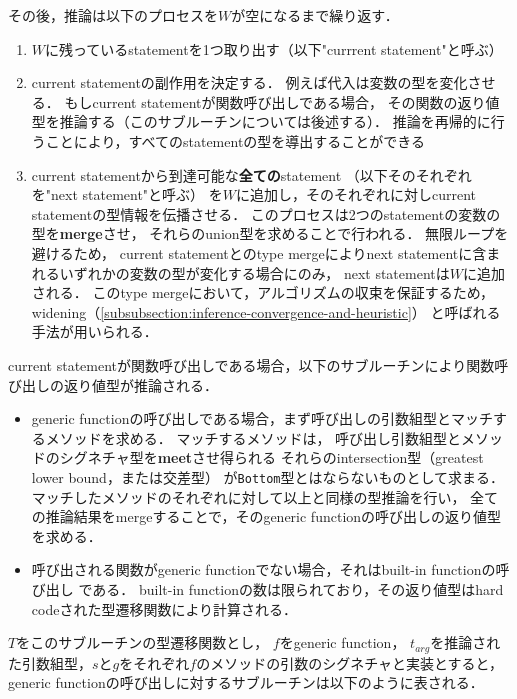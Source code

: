 その後，推論は以下のプロセスを\(W\)が空になるまで繰り返す．

\begin{enumerate}
  \item \(W\)に残っているstatementを1つ取り出す（以下"currrent statement"と呼ぶ）
  \item current statementの副作用を決定する．
        例えば代入は変数の型を変化させる．
        もしcurrent statementが関数呼び出しである場合，
        その関数の返り値型を推論する（このサブルーチンについては後述する）．
        推論を再帰的に行うことにより，すべてのstatementの型を導出することができる
  \item current statementから到達可能な\textbf{全ての}statement
        （以下そのそれぞれを"next statement"と呼ぶ）
        を\(W\)に追加し，そのそれぞれに対しcurrent statementの型情報を伝播させる．
        このプロセスは2つのstatementの変数の型を\textbf{merge}させ，
        それらのunion型を求めることで行われる．
        無限ループを避けるため，
        current statementとのtype mergeによりnext statementに含まれるいずれかの変数の型が変化する場合にのみ，
        next statementは\(W\)に追加される．
        このtype mergeにおいて，アルゴリズムの収束を保証するため，
        widening（\ref{subsubsection:inference-convergence-and-heuristic}）
        と呼ばれる手法が用いられる．
\end{enumerate}

current statementが関数呼び出しである場合，以下のサブルーチンにより関数呼び出しの返り値型が推論される．

\begin{itemize}
  \item generic functionの呼び出しである場合，まず呼び出しの引数組型とマッチするメソッドを求める．
        マッチするメソッドは，
        呼び出し引数組型とメソッドのシグネチャ型を\textbf{meet}させ得られる
        それらのintersection型（greatest lower bound，または交差型）\footnotemark
        が\texttt{Bottom}型とはならないものとして求まる．
        マッチしたメソッドのそれぞれに対して以上と同様の型推論を行い，
        全ての推論結果をmergeすることで，そのgeneric functionの呼び出しの返り値型を求める．
  \item 呼び出される関数がgeneric functionでない場合，それはbuilt-in functionの呼び出し
        である．
        built-in functionの数は限られており，その返り値型はhard codeされた型遷移関数により計算される．
\end{itemize}

\(T\)をこのサブルーチンの型遷移関数とし，
\(f\)をgeneric function，
\(t_{arg}\)を推論された引数組型，\(s\)と\(g\)をそれぞれ\(f\)のメソッドの引数のシグネチャと実装とすると，
generic functionの呼び出しに対するサブルーチンは以下のように表される．

